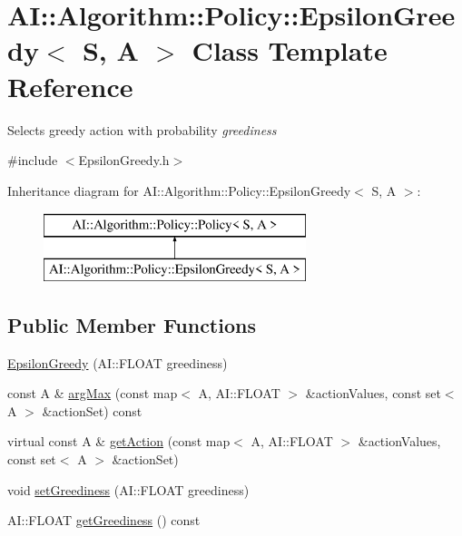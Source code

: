 \hypertarget{classAI_1_1Algorithm_1_1Policy_1_1EpsilonGreedy}{\section{A\-I\-:\-:Algorithm\-:\-:Policy\-:\-:Epsilon\-Greedy$<$ S, A $>$ Class Template Reference}
\label{classAI_1_1Algorithm_1_1Policy_1_1EpsilonGreedy}
}


Selects greedy action with probability {\itshape greediness}  




{\ttfamily \#include $<$Epsilon\-Greedy.\-h$>$}

Inheritance diagram for A\-I\-:\-:Algorithm\-:\-:Policy\-:\-:Epsilon\-Greedy$<$ S, A $>$\-:\begin{figure}[H]
\begin{center}
\leavevmode
\includegraphics[height=2.000000cm]{classAI_1_1Algorithm_1_1Policy_1_1EpsilonGreedy}
\end{center}
\end{figure}
\subsection*{Public Member Functions}
\begin{DoxyCompactItemize}
\item 
\hyperlink{classAI_1_1Algorithm_1_1Policy_1_1EpsilonGreedy_ab891821ceb3fee0f098ceefad9f5a076}{Epsilon\-Greedy} (A\-I\-::\-F\-L\-O\-A\-T greediness)
\item 
const A \& \hyperlink{classAI_1_1Algorithm_1_1Policy_1_1EpsilonGreedy_a1a7489821592b81576e5bc8674fc43c3}{arg\-Max} (const map$<$ A, A\-I\-::\-F\-L\-O\-A\-T $>$ \&action\-Values, const set$<$ A $>$ \&action\-Set) const 
\item 
virtual const A \& \hyperlink{classAI_1_1Algorithm_1_1Policy_1_1EpsilonGreedy_a00a2dde7f4df14fd046e034694184f65}{get\-Action} (const map$<$ A, A\-I\-::\-F\-L\-O\-A\-T $>$ \&action\-Values, const set$<$ A $>$ \&action\-Set)
\item 
void \hyperlink{classAI_1_1Algorithm_1_1Policy_1_1EpsilonGreedy_a2de58f47fa1663ff4718038f2b268295}{set\-Greediness} (A\-I\-::\-F\-L\-O\-A\-T greediness)
\item 
A\-I\-::\-F\-L\-O\-A\-T \hyperlink{classAI_1_1Algorithm_1_1Policy_1_1EpsilonGreedy_aac2b63fbb3cf29eb8ea11f21d8d6185d}{get\-Greediness} () const 
\end{DoxyCompactItemize}
